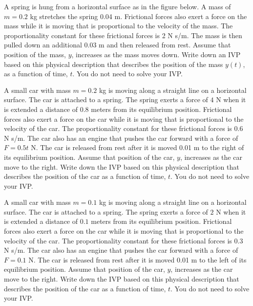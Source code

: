 \ifnum {}

\question[2] A spring is hung from a horizontal surface as in the figure below. A mass of $m=0.2$ kg stretches the spring 0.04 m. Frictional forces also exert a force on the mass while it is moving that is proportional to the velocity of the mass. The proportionality constant for these frictional forces is 2 N s/m. The mass is then pulled down an additional 0.03 m and then released from rest. Assume that position of the mass, $y$, increases as the mass moves down. Write down an IVP based on this physical description that describes the position of the mass $y(t)$, as a function of time, $t$. You do not need to solve your IVP. \\[4pt]

\vspace{2cm}
\fi 


\ifnum {}
\question[2] A small car with mass $m = 0.2$ kg is moving along a straight line on a horizontal surface. The car is attached to a spring. The spring exerts a force of $4$ N when it is extended a distance of $0.8$ meters from its equilibrium position. Frictional forces also exert a force on the car while it is moving that is proportional to the velocity of the car. The proportionality constant for these frictional forces is $0.6$ N s/m. The car also has an engine that pushes the car forward with a force of $F = 0.5t$ N. The car is released from rest after it is moved 0.01 m to the right of its equilibrium position. Assume that position of the car, $y$, increases as the car move to the right. Write down the IVP based on this physical description that describes the position of the car as a function of time, $t$. You do not need to solve your IVP. \\

\fi 

\ifnum {}
\question[2] A small car with mass $m = 0.1$ kg is moving along a straight line on a horizontal surface. The car is attached to a spring. The spring exerts a force of $2$ N when it is extended a distance of $0.1$ meters from its equilibrium position. Frictional forces also exert a force on the car while it is moving that is proportional to the velocity of the car. The proportionality constant for these frictional forces is $0.3$ N s/m. The car also has an engine that pushes the car forward with a force of $F = 0.1$ N. The car is released from rest after it is moved 0.01 m to the left of its equilibrium position. Assume that position of the car, $y$, increases as the car move to the right. Write down the IVP based on this physical description that describes the position of the car as a function of time, $t$. You do not need to solve your IVP. \\

\fi 

